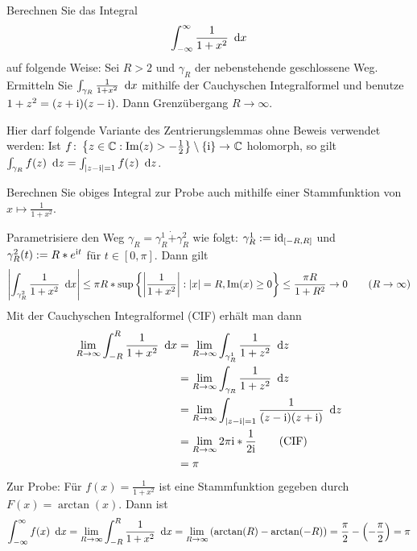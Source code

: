 \begin{exercisePage}
	\begin{task}
		Berechnen Sie das Integral
		\begin{equation*}
			\int_{-\infty}^\infty \frac{1}{1 + x^2} \enskip \mathrm{d}x
		\end{equation*}
		auf folgende Weise: Sei $R > 2$ und $\gamma_R$ der nebenstehende geschlossene Weg. Ermitteln Sie $\int_{\gamma_R} \frac{1}{1 + x^2} \enskip \mathrm{d}x$ mithilfe der Cauchyschen Integralformel und benutze $1 + z^2 = (z+\mathrm{i}) (z - \mathrm{i})$. Dann Grenzübergang $R \to \infty$. 
		
		Hier darf folgende Variante des Zentrierungslemmas ohne Beweis verwendet werden: Ist $\abb{f}{\menge{z \in \CC : \Im(z) > -\frac{1}{2}} \setminus \menge{\i}}{\CC}$ holomorph, so gilt $\int_{\gamma_R} f(z) \enskip \mathrm{d}z = \int_{\left| z-\mathrm{i} \right| = 1} f(z) \enskip \mathrm{d}z$.
		
		Berechnen Sie obiges Integral zur Probe auch mithilfe einer Stammfunktion von $x \mapsto \frac{1}{1 + x^2}$.
	\end{task}

	Parametrisiere den Weg $\gamma_R = \gamma_R^1 \dot{+} \gamma_R^2$ wie folgt: $\gamma_R^1 \mathrel{:=} \operatorname{id}_{[-R,R]}$ und $\gamma_R^2(t) \mathrel{:=} R*e^{\mathrm{i} t}$ für $t \in [0,\pi]$. Dann gilt 
	\begin{equation*}
		\left| \int_{\gamma_R^2} \frac{1}{1+x^2} \enskip \mathrm{d}x \right| \le \pi R * \sup\left\{ \left| \frac{1}{1+x^2} \right| : \left| x \right|=R, \operatorname{Im}(x) \ge 0 \right\} \le \frac{\pi R}{1 + R^2} \to 0 \tag{$R \to \infty$}
	\end{equation*}
	Mit der Cauchyschen Integralformel (CIF) erhält man dann
	\begin{align*}
		\lim_{R \to \infty} \int_{-R}^R \frac{1}{1 + x^2} \enskip \mathrm{d}x 
		&= \lim_{R \to \infty} \int_{\gamma_R^1} \frac{1}{1 + z^2} \enskip \mathrm{d}z \\
		&= \lim_{R \to \infty} \int_{\gamma_R} \frac{1}{1 + z^2} \enskip \mathrm{d}z \\
		&= \lim_{R \to \infty} \int_{\left| z - \mathrm{i} \right| = 1} \frac{1}{(z- \mathrm{i})(z + \mathrm{i})} \enskip \mathrm{d}z \\
		&= \lim_{R \to \infty} 2\pi \mathrm{i} * \frac{1}{2\mathrm{i}}  \tag{CIF} \\
		&= \pi
	\end{align*}
	Zur Probe: Für $f(x) = \frac{1}{1 + x^2}$ ist eine Stammfunktion gegeben durch $F(x) = \arctan(x)$. Dann ist
	\begin{equation*}
		\int_{-\infty}^\infty f(x) \enskip \mathrm{d}x = \lim_{R \to \infty} \int_{-R}^R \frac{1}{1 + x^2} \enskip \mathrm{d}x = \lim_{R \to \infty} \left( \arctan(R) - \arctan(-R) \right) = \frac{\pi}{2} - \left( -\frac{\pi}{2} \right) = \pi
	\end{equation*}


\end{exercisePage}
